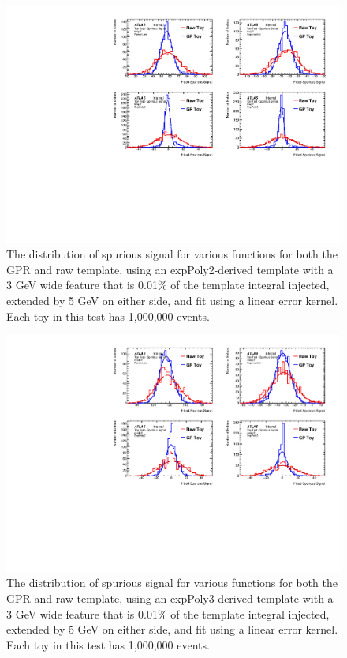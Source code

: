 \begin{figure}  
\begin{center}
  \includegraphics[width=\textwidth]{figures/background/gpr/validation/linear/ToyTest_FitSigVals_lowpT_100_Siginj}   
\caption{The distribution of spurious signal for various functions for both the GPR and raw template, using an expPoly2-derived template with a 3 GeV wide feature that is 0.01\% of the template integral injected, extended by 5 GeV on either side, and fit using a linear error kernel. Each toy in this test has 1,000,000 events.}
\label{fig:linearkernel_lowpt_100_Siginj}
\end{center}
\end{figure}

\begin{figure} 
\begin{center}
  \includegraphics[width=\textwidth]{figures/background/gpr/validation/linear/ToyTest_FitSigVals_medpT_100_Siginj}   
\caption{The distribution of spurious signal for various functions for both the GPR and raw template, using an expPoly3-derived template with a 3 GeV wide feature that is 0.01\% of the template integral injected, extended by 5 GeV on either side, and fit using a linear error kernel. Each toy in this test has 1,000,000 events.}
\label{fig:linearkernel_medpt_100_Siginj}
\end{center}
\end{figure}

